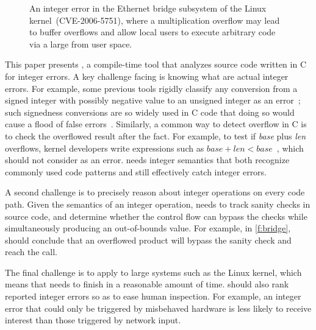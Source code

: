 \begin{figure}[t]
\centering

\vspace{-1em}
\caption{An integer error in the Ethernet bridge subsystem of the
Linux kernel~(CVE-2006-5751), where a multiplication overflow
may lead to buffer overflows and allow local users to execute
arbitrary code via a large  from user space.
}
\label{f:bridge}
\end{figure}

This paper presents \sys, a compile-time tool that analyzes
source code written in C for integer errors.
%
A key challenge facing \sys is knowing what are actual integer errors.  For
example, some previous tools rigidly classify any conversion from a
signed integer with possibly negative value to an unsigned integer
as an error~\cite{brumley:rich, moy:z3prefix, seacord:secure-c}; 
such signedness conversions are so widely used in C
code that doing so would cause a flood of false
errors~\cite[\subsectionautorefname~6.2]{moy:z3prefix}.
Similarly, a common way to detect overflow in C is to 
check the overflowed result after the fact. For example, to test
if \textit{base} plus \textit{len} overflows, kernel developers write
expressions such as $\mathit{base} + \mathit{len} < \mathit{base}$~\cite{ioc},
which \sys should not consider as an error.
\sys needs integer semantics that both recognize commonly used code patterns
and still effectively catch integer errors.

A second challenge is to precisely reason about integer operations
on every code path.  Given the semantics of an integer operation,
\sys needs to track sanity checks in source code, and determine
whether the control flow can bypass the checks while simultaneously
producing an out-of-bounds value.  For example, in \autoref{f:bridge},
\sys should conclude that an overflowed product  will
bypass the sanity check and reach the  call.

The final challenge is to apply \sys to large systems such as the
Linux kernel, which means that \sys needs to finish in a
reasonable amount of time.  \sys should also rank reported integer
errors so as to ease human inspection.  For example, an integer error
that could only be triggered by misbehaved hardware is
less likely to receive interest than those triggered by network input.

